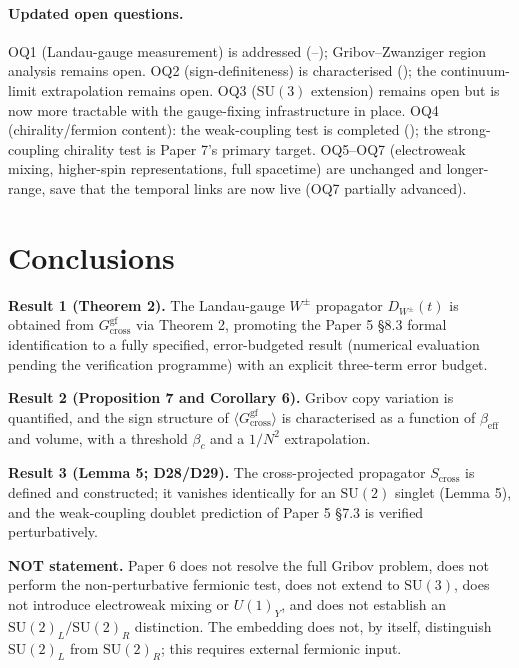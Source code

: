 \documentclass[11pt,a4paper]{article}
\theoremstyle{plain}
\theoremstyle{definition}
\theoremstyle{remark}
\newcommand{\SU}{\mathrm{SU}}
\newcommand{\Gcrossgf}{G_{\mathrm{cross}}^{\mathrm{gf}}}
\newcommand{\DW}{D_{W^{\pm}}}
\newcommand{\Scross}{S_{\mathrm{cross}}}
\newcommand{\be}{\beta_{\mathrm{eff}}}
\newcommand{\bc}{\beta_{c}}
\begin{document}
\paragraph{Updated open questions.}
OQ1 (Landau-gauge measurement) is addressed
(--); Gribov--Zwanziger region
analysis remains open. OQ2 (sign-definiteness) is characterised
(); the continuum-limit extrapolation remains
open. OQ3 ($\SU(3)$ extension) remains open but is now more tractable
with the gauge-fixing infrastructure in place. OQ4 (chirality/fermion
content): the weak-coupling test is completed (); the
strong-coupling chirality test is Paper 7's primary target. OQ5--OQ7
(electroweak mixing, higher-spin representations, full spacetime) are
unchanged and longer-range, save that the temporal links are now live
(OQ7 partially advanced).

\section{Conclusions}
\label{sec:conclusions}

\textbf{Result 1 (Theorem 2).} The Landau-gauge $W^{\pm}$ propagator
$\DW(t)$ is obtained from $\Gcrossgf$ via Theorem 2, promoting the Paper 5
\S8.3 formal identification to a fully specified, error-budgeted result
(numerical evaluation pending the verification programme) with an explicit
three-term error budget.

\textbf{Result 2 (Proposition 7 and Corollary 6).} Gribov copy variation
is quantified, and the sign structure of $\langle\Gcrossgf\rangle$ is
characterised as a function of $\be$ and volume, with a threshold $\bc$
and a $1/N^2$ extrapolation.

\textbf{Result 3 (Lemma 5; D28/D29).} The cross-projected propagator
$\Scross$ is defined and constructed; it vanishes identically for an
$\SU(2)$ singlet (Lemma 5), and the weak-coupling doublet prediction of
Paper 5 \S7.3 is verified perturbatively.

\textbf{NOT statement.} Paper 6 does not resolve the full Gribov problem,
does not perform the non-perturbative fermionic test, does not extend to
$\SU(3)$, does not introduce electroweak mixing or $U(1)_Y$, and does not
establish an $\SU(2)_L/\SU(2)_R$ distinction. The embedding does not, by
itself, distinguish $\SU(2)_L$ from $\SU(2)_R$; this requires external
fermionic input.
\end{document}
